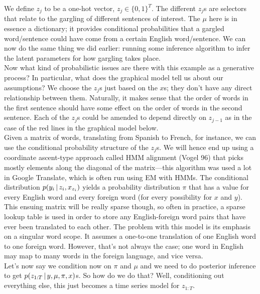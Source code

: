 \documentclass{article}
\begin{document}
We define $z_j$ to be a one-hot vector, $z_j \in \{0,1\}^T$. The different $z_j$s are selectors that relate to the gargling of different sentences of interest. The $\mu$ here is in essence a dictionary; it provides conditional probabilities that a gargled word/sentence could have come from a certain English word/sentence. We can now do the same thing we did earlier: running some inference algorithm to infer the latent parameters for how gargling takes place.\\

Now what kind of probabilistic issues are there with this example as a generative process? In particular, what does the graphical model tell us about our assumptions? We choose the $z_j$s just based on the $x$s; they don't have any direct relationship between them. Naturally, it makes sense that the order of words in the first sentence should have some effect on the order of words in the second sentence. Each of the $z_j$s could be amended to depend directly on $z_{j-1}$ as in the case of the red lines in the graphical model below.\\

Given a matrix of words, translating from Spanish to French, for instance, we can use the conditional probability structure of the $z_j$s. We will hence end up using a coordinate ascent-type approach called HMM alignment (Vogel 96) that picks mostly elements along the diagonal of the matrix---this algorithm was used a lot in Google Translate, which is often run using EM with HMMs. The conditional distribution $p(y_i \,|\, z_i, x_{z_i})$ yields a probability distribution $\pi$ that has a value for every English word and every foreign word (for every possibility for $x$ and $y$). This ensuing matrix will be really sparse though, so often in practice, a sparse lookup table is used in order to store any English-foreign word pairs that have ever been translated to each other. The problem with this model is its emphasis on a singular word scope. It assumes a one-to-one translation of one English word to one foreign word. However, that's not always the case; one word in English may map to many words in the foreign language, and vice versa.\\

Let's now say we condition now on $\pi$ and $\mu$ and we need to do posterior inference to get $p(z_{1:T} \,|\, y, \mu, \pi, x)$s. So how do we do that? Well, conditioning out everything else, this just becomes a time series model for $z_{1:T}$.\\
\end{document}
